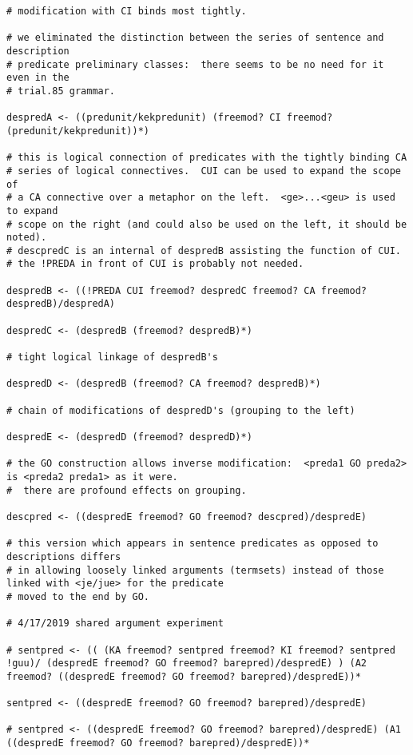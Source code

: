 \documentclass{article}
\begin{document}
\begin{verbatim}
# modification with CI binds most tightly.

# we eliminated the distinction between the series of sentence and description
# predicate preliminary classes:  there seems to be no need for it even in the 
# trial.85 grammar.

despredA <- ((predunit/kekpredunit) (freemod? CI freemod? (predunit/kekpredunit))*)

# this is logical connection of predicates with the tightly binding CA
# series of logical connectives.  CUI can be used to expand the scope of
# a CA connective over a metaphor on the left.  <ge>...<geu> is used to expand
# scope on the right (and could also be used on the left, it should be noted).
# descpredC is an internal of despredB assisting the function of CUI.
# the !PREDA in front of CUI is probably not needed.

despredB <- ((!PREDA CUI freemod? despredC freemod? CA freemod? despredB)/despredA)

despredC <- (despredB (freemod? despredB)*)

# tight logical linkage of despredB's

despredD <- (despredB (freemod? CA freemod? despredB)*)

# chain of modifications of despredD's (grouping to the left)

despredE <- (despredD (freemod? despredD)*)

# the GO construction allows inverse modification:  <preda1 GO preda2> is <preda2 preda1> as it were.
#  there are profound effects on grouping.

descpred <- ((despredE freemod? GO freemod? descpred)/despredE)

# this version which appears in sentence predicates as opposed to descriptions differs
# in allowing loosely linked arguments (termsets) instead of those linked with <je/jue> for the predicate
# moved to the end by GO.

# 4/17/2019 shared argument experiment

# sentpred <- (( (KA freemod? sentpred freemod? KI freemod? sentpred !guu)/ (despredE freemod? GO freemod? barepred)/despredE) ) (A2 freemod? ((despredE freemod? GO freemod? barepred)/despredE))*

sentpred <- ((despredE freemod? GO freemod? barepred)/despredE)

# sentpred <- ((despredE freemod? GO freemod? barepred)/despredE) (A1 ((despredE freemod? GO freemod? barepred)/despredE))*


\end{verbatim}
\end{document}
